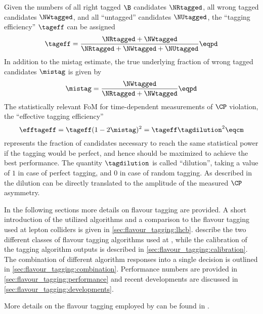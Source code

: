 Given the numbers of all right tagged $\B$ candidates $\NRtagged$, all wrong
tagged candidates $\NWtagged$, and all \enquote{untagged} candidates
$\NUtagged$, the \enquote{tagging efficiency} $\tageff$ can be assigned
%
\begin{equation}\label{eq:flavour_tagging:tageff}
  \tageff = \frac{\NRtagged + \NWtagged}{\NRtagged + \NWtagged + \NUtagged}\eqpd
\end{equation}
%
In addition to the mistag estimate, the true underlying fraction of wrong tagged
candidates $\mistag$ is given by
%
\begin{equation}\label{eq:flavour_tagging:mistag}
  \mistag = \frac{\NWtagged}{\NRtagged + \NWtagged}\eqpd
\end{equation}
%
The statistically relevant \acl{FoM} for time-dependent measurements of $\CP$
violation, the \enquote{effective
tagging efficiency}
%
\begin{equation}\label{eq:flavour_tagging:efftageff}
  \efftageff = \tageff(1 - 2 \mistag)^2 = \tageff \tagdilution^2 \eqcm
\end{equation}
%
represents the fraction of candidates necessary to reach the same statistical
power if the tagging would be perfect, and hence should be maximized to achieve
the best performance. The quantity $\tagdilution$ is called \enquote{dilution},
taking a value of $1$ in case of perfect tagging, and $0$ in case of random
tagging. As described in  the dilution can be directly translated
to the amplitude of the measured $\CP$ asymmetry.

In the following sections more details on flavour tagging are provided. A short
introduction of the utilized algorithms and a comparison to the flavour tagging
used at lepton colliders is given in \cref{sec:flavour_tagging:lhcb}.
 describe the two different
classes of flavour tagging algorithms used at \LHCb, while the calibration of
the tagging algorithm outputs is described in
\cref{sec:flavour_tagging:calibration}. The combination of different algorithm
responses into a single decision is outlined in
\cref{sec:flavour_tagging:combination}. Performance numbers are provided in
\cref{sec:flavour_tagging:performance} and recent developments are discussed in
\cref{sec:flavour_tagging:developments}.

More details on the flavour tagging employed by \LHCb can be found in
\cite{Aaij:2012mu,FT:RunI}.

